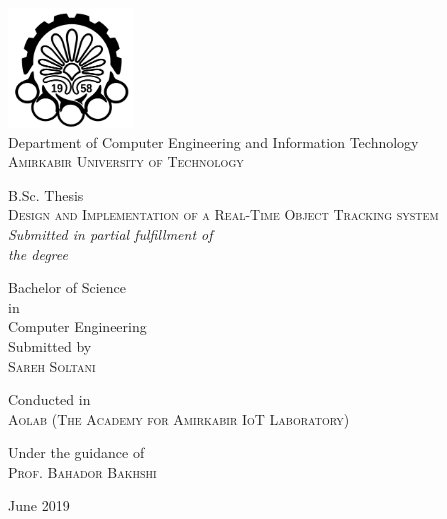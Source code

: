 \begin{titlepage}
	
	\begin{center}
		
		\includegraphics[width=0.25\textwidth]{nitc-logo}\\[0.1in]
		\normalsize{Department of Computer Engineering and Information Technology}\\
		\normalsize
		\textsc{Amirkabir University of Technology}\\
		\vspace{0.5cm}
		
		
		\textup{\large {\sc B.Sc. Thesis}} %
		\\[0.4in]
		
		\Large \textsc {Design and Implementation of a Real-Time Object Tracking system}\\[0.5in]
		
		\vspace{0.1in}
		\small \emph{Submitted in partial fulfillment of\\
			the degree}
		\vspace{.2in}
		
		{\sc Bachelor of Science \\in\\ Computer Engineering}\\[0.5in]
		
		\vspace{0.3in}
		\normalsize Submitted by\\
		\vspace{0.06in}
		\textsc{\large Sareh Soltani}
		
		\vspace{0.3in}
		\normalsize Conducted in\\
		\vspace{0.06in}
		\textsc{\small Aolab (The Academy for Amirkabir IoT Laboratory)}
		
		\vspace{.3in}
		Under the guidance of\\
		\vspace{0.06in}
		\textsc{\large Prof. Bahador Bakhshi}
		
		\vfill
		June 2019
				
	\end{center}	
\end{titlepage}